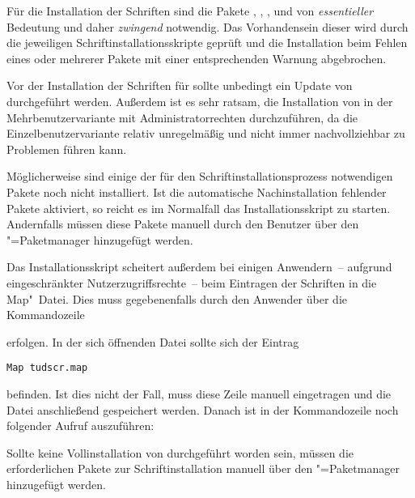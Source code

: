 
Für die Installation der Schriften sind die Pakete , 
, ,  und 
 von \emph{essentieller} Bedeutung und daher \emph{zwingend} 
notwendig. Das Vorhandensein dieser wird durch die jeweiligen 
Schriftinstallationsskripte geprüft und die Installation beim Fehlen eines oder 
mehrerer Pakete mit einer entsprechenden Warnung abgebrochen.



Vor der Installation der Schriften für \TUDScript sollte unbedingt ein Update 
von \MiKTeX durchgeführt werden. Außerdem ist es sehr ratsam, die Installation 
von \MiKTeX in der Mehrbenutzervariante mit Administratorrechten durchzuführen, 
da die Einzelbenutzervariante relativ unregelmäßig und nicht immer 
nachvollziehbar zu Problemen führen kann. 

Möglicherweise sind einige der für den Schriftinstallationsprozess notwendigen 
Pakete noch nicht installiert. Ist die automatische Nachinstallation fehlender 
Pakete aktiviert, so reicht es im Normalfall das Installationsskript zu 
starten. Andernfalls müssen diese Pakete manuell durch den Benutzer über den 
\MiKTeX"=Paketmanager hinzugefügt werden.

Das Installationsskript scheitert außerdem bei einigen Anwendern~-- aufgrund 
eingeschränkter Nutzerzugriffsrechte~-- beim Eintragen der Schriften in die 
Map"~Datei. Dies muss gegebenenfalls durch den Anwender über die Kommandozeile 
%
\begin{quoting}
\RET
\end{quoting}
%
erfolgen. In der sich öffnenden Datei sollte sich der Eintrag 
%
\begin{quoting}
\texttt{Map~tudscr.map}
\end{quoting}
%
befinden. Ist dies nicht der Fall, muss diese Zeile manuell eingetragen und die 
Datei anschließend gespeichert werden. Danach ist in der Kommandozeile noch 
folgender Aufruf auszuführen:
%
\begin{quoting}
\RET
\end{quoting}



Sollte keine Vollinstallation von \TeXLive durchgeführt worden sein, müssen die 
erforderlichen Pakete zur Schriftinstallation manuell über den 
\TeXLive"=Paketmanager hinzugefügt werden.

